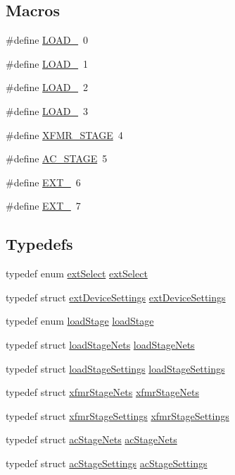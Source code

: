\subsection*{Macros}
\begin{DoxyCompactItemize}
\item 
\#define \hyperlink{a00027_a007a209cd2e2b935be1f69218652edc1}{L\-O\-A\-D\-\_}~0
\item 
\#define \hyperlink{a00027_a363f09c63f2ecb9086b47d72a3f3f57d}{L\-O\-A\-D\-\_}~1
\item 
\#define \hyperlink{a00027_af7c1e96216e7b48160e5a03afe8ac807}{L\-O\-A\-D\-\_}~2
\item 
\#define \hyperlink{a00027_a2c862ec4115c4a016b61800609f236a7}{L\-O\-A\-D\-\_}~3
\item 
\#define \hyperlink{a00027_a873d529c32530ec23fbf76318011aeee}{X\-F\-M\-R\-\_\-\-S\-T\-A\-G\-E}~4
\item 
\#define \hyperlink{a00027_a3fc4318ae73eae35339f616047300b0f}{A\-C\-\_\-\-S\-T\-A\-G\-E}~5
\item 
\#define \hyperlink{a00027_ae72b26dfe821ff1cfeb352b6b54e5cbb}{E\-X\-T\-\_}~6
\item 
\#define \hyperlink{a00027_a461d83d7d883765da6f6b257a7a4c385}{E\-X\-T\-\_}~7
\end{DoxyCompactItemize}
\subsection*{Typedefs}
\begin{DoxyCompactItemize}
\item 
typedef enum \hyperlink{a00027_a258413561252a6c94af200747272a9f3}{ext\-Select} \hyperlink{a00027_a70b24a6c60fcd622c699e09219a34da0}{ext\-Select}
\item 
typedef struct \hyperlink{a00005}{ext\-Device\-Settings} \hyperlink{a00027_aa0c9d277e59731716a1973e29ea96246}{ext\-Device\-Settings}
\item 
typedef enum \hyperlink{a00027_a2820f1e18d921d2f1e97d53404b9fbae}{load\-Stage} \hyperlink{a00027_af7950a62c78fd817e8115e55c0f4bb44}{load\-Stage}
\item 
typedef struct \hyperlink{a00007}{load\-Stage\-Nets} \hyperlink{a00027_aae981f2f918bbbfae4517a68d60ffb45}{load\-Stage\-Nets}
\item 
typedef struct \hyperlink{a00008}{load\-Stage\-Settings} \hyperlink{a00027_a23ea7275d3010efb32f35ffe237401ff}{load\-Stage\-Settings}
\item 
typedef struct \hyperlink{a00009}{xfmr\-Stage\-Nets} \hyperlink{a00027_a583225b973f6b7cb16edbff4d3dadeab}{xfmr\-Stage\-Nets}
\item 
typedef struct \hyperlink{a00010}{xfmr\-Stage\-Settings} \hyperlink{a00027_ab13cb1eb6c11d220d249e98a5250235a}{xfmr\-Stage\-Settings}
\item 
typedef struct \hyperlink{a00003}{ac\-Stage\-Nets} \hyperlink{a00027_a8e395a646881dbb659b7fdaff0f80be0}{ac\-Stage\-Nets}
\item 
typedef struct \hyperlink{a00004}{ac\-Stage\-Settings} \hyperlink{a00027_a32c7a835db0120b8a119548c2a0337d5}{ac\-Stage\-Settings}
\end{DoxyCompactItemize}
